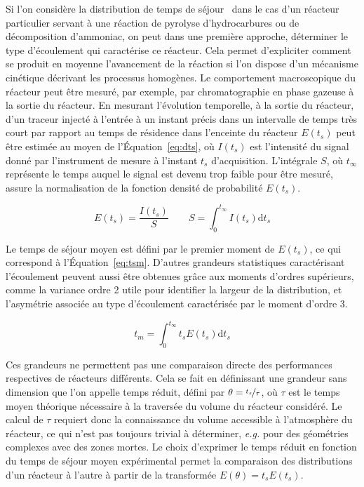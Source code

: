 Si l'on considère la distribution de temps de séjour~\cite{Fogler1999} dans le cas d'un réacteur particulier servant à une réaction de pyrolyse d'hydrocarbures ou de décomposition d'ammoniac, on peut dans une première approche, déterminer le type d'écoulement qui caractérise ce réacteur. Cela permet d'expliciter comment se produit en moyenne l'avancement de la réaction si l'on dispose d'un mécanisme cinétique décrivant les processus homogènes. Le comportement macroscopique du réacteur peut être mesuré, par exemple, par chromatographie en phase gazeuse à la sortie du réacteur. En mesurant l'évolution temporelle, à la sortie du réacteur, d'un traceur injecté à l'entrée à un instant précis \textendash{} dans un intervalle de temps très court par rapport au temps de résidence dans l'enceinte du réacteur \textendash{} $E(t_{s})$ peut être estimée au moyen de l'Équation~\ref{eq:dts}, où $I(t_{s})$ est l'intensité du signal donné par l'instrument de mesure à l'instant $t_{s}$ d'acquisition.  L'intégrale $S$, où $t_{\infty}$ représente le temps auquel le signal est devenu trop faible pour être mesuré, assure la normalisation de la fonction densité de probabilité $E(t_{s})$.

\begin{equation}
  E(t_{s})=\frac{I(t_{s})}{S}\qquad
  S=\int_{0}^{t_{\infty}}I(t_{s})\mathrm{d}t_{s}
  \label{eq:dts}
\end{equation}

Le temps de séjour moyen est défini par le premier moment de $E(t_{s})$, ce qui correspond à l'Équation~\ref{eq:tsm}. D'autres grandeurs statistiques caractérisant l'écoulement peuvent aussi être obtenues grâce aux moments d'ordres supérieurs, comme la variance \textendash{} ordre 2 \textendash{} utile pour identifier la largeur de la distribution, et l'asymétrie associée au type d'écoulement caractérisée par le moment d'ordre 3.

\begin{equation}
 t_{m}=\int_{0}^{t_{\infty}}t_{s}E(t_{s})\mathrm{d}t_{s}
 \label{eq:tsm}
\end{equation}

Ces grandeurs ne permettent pas une comparaison directe des performances respectives de réacteurs différents. Cela se fait en définissant une grandeur sans dimension que l'on appelle \og{}temps réduit\fg{}, défini par $\theta=\nicefrac{t_{s}}{\tau}$, où $\tau$ est le temps moyen théorique nécessaire à la traversée du volume du réacteur considéré.  Le calcul de $\tau$ requiert donc la connaissance du volume accessible à l'atmosphère du réacteur, ce qui n'est pas toujours trivial à déterminer, \textit{e.g.} pour des géométries complexes avec des \og{}zones mortes\fg{}. Le choix d'exprimer le temps réduit en fonction du temps de séjour moyen expérimental permet la comparaison des distributions d'un réacteur à l'autre à partir de la transformée $E(\theta)=t_{s}E(t_{s})$.

